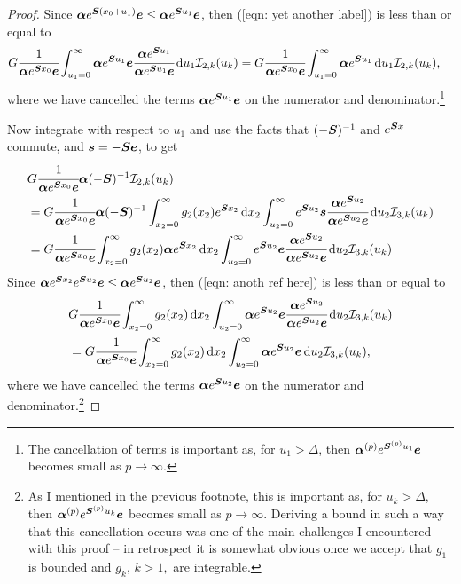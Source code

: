 \begin{proof}
	Since \( \boldsymbol \alpha e^{\boldsymbol{S}(x_0 +u_1)}\boldsymbol e \leq \boldsymbol \alpha e^{\boldsymbol{S}u_1}\boldsymbol e \), then (\ref{eqn: yet another label}) is less than or equal to 
	\begin{align}
		&G  \cfrac{1}{\boldsymbol \alpha e^{\boldsymbol{S}x_0}\boldsymbol e} \int_{u_1=0}^\infty \boldsymbol \alpha e^{\boldsymbol{S}u_1}\boldsymbol e \cfrac{\boldsymbol \alpha e^{\boldsymbol{S}u_1}}{\boldsymbol \alpha e^{\boldsymbol{S}u_1}\boldsymbol e}\, \mathrm{d} u_1 \mathcal I_{2,k}(u_k) \nonumber
		=G  \cfrac{1}{\boldsymbol \alpha e^{\boldsymbol{S} x_0 }\boldsymbol e} \int_{u_1=0}^\infty \boldsymbol \alpha e^{\boldsymbol{S}u_1}\, \mathrm{d} u_1 \mathcal I_{2,k}(u_k), 
	\end{align}
	where we have cancelled the terms \(\boldsymbol \alpha e^{\boldsymbol{S}u_1}\boldsymbol e\) on the numerator and denominator.\footnote{The cancellation of terms is important as, for \(u_1>\Delta\), then \(\boldsymbol \alpha^{(p)} e^{\boldsymbol{S}^{(p)}u_1}\boldsymbol e\) becomes small as \(p\to\infty\).}

	Now integrate with respect to \(u_1\) and use the facts that \((-\boldsymbol{S})^{-1}\) and \(e^{\boldsymbol{S}x}\) commute, and \(\boldsymbol s = - \boldsymbol{S} \boldsymbol e \), to get 
	\begin{align}
		& G  \cfrac{1}{\boldsymbol \alpha e^{\boldsymbol{S}x_0}\boldsymbol e} \boldsymbol \alpha (-\boldsymbol{S})^{-1}  \mathcal I_{2,k}(u_k) \label{eqn: rep from here}
		\\& = G  \cfrac{1}{\boldsymbol \alpha e^{\boldsymbol{S}x_0}\boldsymbol e}  \boldsymbol \alpha (-\boldsymbol{S})^{-1} \int_{x_2=0}^\infty g_2(x_2)  e^{\boldsymbol{S}x_2} \, \mathrm{d} x_2 \int_{u_2=0}^\infty e^{\boldsymbol{S}u_2}\boldsymbol s \cfrac{\boldsymbol \alpha e^{\boldsymbol{S}u_2}}{\boldsymbol \alpha e^{\boldsymbol{S}u_2}\boldsymbol e}\, \mathrm{d} u_2 \mathcal I_{3,k}(u_k)\nonumber 
		\\& = G  \cfrac{1}{\boldsymbol \alpha e^{\boldsymbol{S}x_0}\boldsymbol e}  \int_{x_2=0}^\infty g_2(x_2) \boldsymbol \alpha e^{\boldsymbol{S}x_2} \, \mathrm{d} x_2 \int_{u_2=0} ^\infty e^{\boldsymbol{S}u_2}\boldsymbol e \cfrac{\boldsymbol \alpha e^{\boldsymbol{S}u_2}}{\boldsymbol \alpha e^{\boldsymbol{S}u_2}\boldsymbol e}\, \mathrm{d} u_2 \mathcal I_{3,k}(u_k)\label{eqn: anoth ref here}
	\end{align}
	Since \(\boldsymbol \alpha e^{\boldsymbol{S}x_2}e^{\boldsymbol{S}u_2}\boldsymbol e \leq \boldsymbol \alpha e^{\boldsymbol{S}u_2}\boldsymbol e \), then (\ref{eqn: anoth ref here}) is less than or equal to 
	\begin{align}
		& G  \cfrac{1}{\boldsymbol \alpha e^{\boldsymbol{S}x_0}\boldsymbol e}  \int_{x_2=0}^\infty g_2(x_2) \, \mathrm{d} x_2 \int_{u_2=0}^\infty \boldsymbol \alpha e^{\boldsymbol{S}u_2}\boldsymbol e \cfrac{\boldsymbol \alpha e^{\boldsymbol{S}u_2}}{\boldsymbol \alpha e^{\boldsymbol{S}u_2}\boldsymbol e}\, \mathrm{d} u_2 \mathcal I_{3,k}(u_k) \nonumber
		\\&= G  \cfrac{1}{\boldsymbol \alpha e^{\boldsymbol{S}x_0}\boldsymbol e}  \int_{x_2=0}^\infty g_2(x_2) \, \mathrm{d} x_2 \int_{u_2=0}^\infty \boldsymbol \alpha e^{\boldsymbol{S}u_2}\boldsymbol e\, \mathrm{d} u_2 \mathcal I_{3,k}(u_k), \label{eqn: allalalalalalal}
	\end{align}
	where we have cancelled the terms \(\boldsymbol \alpha e^{\boldsymbol{S}u_2}\boldsymbol e\) on the numerator and denominator.\footnote{As I mentioned in the previous footnote, this is important as, for \(u_k>\Delta\), then \(\boldsymbol \alpha^{(p)} e^{\boldsymbol{S}^{(p)}u_k}\boldsymbol e\) becomes small as \(p\to\infty\). Deriving a bound in such a way that this cancellation occurs was one of the main challenges I encountered with this proof -- in retrospect it is somewhat obvious once we accept that \(g_1\) is bounded and \(g_k,\,k>1,\) are integrable.}


\end{proof}

